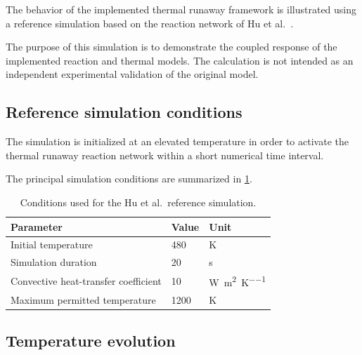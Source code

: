 

The behavior of the implemented thermal runaway framework is illustrated
using a reference simulation based on the reaction network of
Hu et al.~\cite{hu2020inhibition}.

The purpose of this simulation is to demonstrate the coupled response of
the implemented reaction and thermal models. The calculation is not
intended as an independent experimental validation of the original model.


\subsection{Reference simulation conditions}

The simulation is initialized at an elevated temperature in order to
activate the thermal runaway reaction network within a short numerical
time interval.

The principal simulation conditions are summarized in
\cref{tab:reference_simulation_conditions}.

\begin{table}[htbp]
    \centering
    \caption{Conditions used for the Hu et al.\ reference simulation.}
    \label{tab:reference_simulation_conditions}

    \begin{tabular}{lll}
        \toprule
        Parameter & Value & Unit \\
        \midrule
        Initial temperature
        & 480
        & \si{\kelvin}
        \\

        Simulation duration
        & 20
        & \si{\second}
        \\

        Convective heat-transfer coefficient
        & 10
        & \si{\watt\per\meter\squared\per\kelvin}
        \\

        Maximum permitted temperature
        & 1200
        & \si{\kelvin}
        \\

        \bottomrule
    \end{tabular}
\end{table}


\subsection{Temperature evolution}


